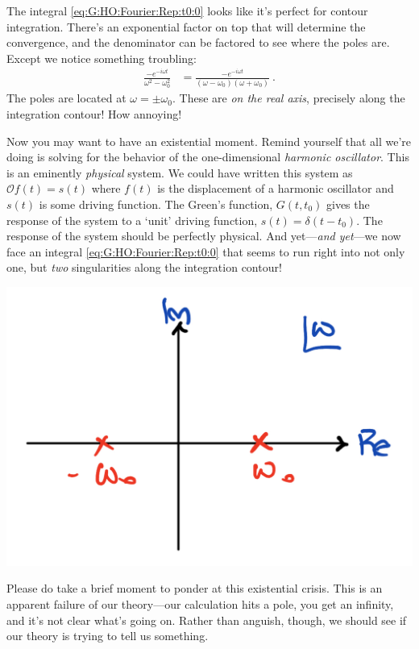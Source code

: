 The integral \eqref{eq:G:HO:Fourier:Rep:t0:0} looks like it's perfect for contour integration. There's an exponential factor on top that will determine the convergence, and the denominator can be factored to see where the poles are. Except we notice something troubling:
\begin{align}
	\frac{-e^{-i\omega t}}{\omega^2-\omega_0^2} 
	&=
	\frac{-e^{-i\omega t}}{(\omega - \omega_0)(\omega + \omega_0)} \ .
	\label{eq:HO:integrand:real:pole}
\end{align}
The poles are located at $\omega = \pm \omega_0$. These are \emph{on the real axis}, precisely along the integration contour! How annoying!

Now you may want to have an existential moment. Remind yourself that all we're doing is solving for the behavior of the one-dimensional \emph{harmonic oscillator}. This is an eminently \emph{physical} system. We could have written this system as $\mathcal O f(t) = s(t)$ where $f(t)$ is the displacement of a harmonic oscillator and $s(t)$ is some driving function. The Green's function, $G(t,t_0)$ gives the response of the system to a `unit' driving function, $s(t) = \delta(t-t_0)$. The response of the system should be perfectly physical. And yet---\emph{and yet}---we now face an integral \eqref{eq:G:HO:Fourier:Rep:t0:0} that seems to run right into not only one, but \emph{two} singularities along the integration contour!
\begin{center}
\includegraphics[width=.4\textwidth]{figures/Lec_2017_16_HO_Poles.pdf}
\end{center}
Please do take a brief moment to ponder at this existential crisis. This is an apparent failure of our theory---our calculation hits a pole, you get an infinity, and it's not clear what's going on. Rather than anguish, though, we should see if our theory is trying to tell us something. 

